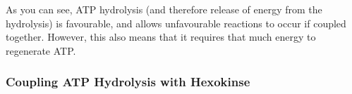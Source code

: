 As you can see, ATP hydrolysis (and therefore release of energy from the hydrolysis) is favourable, and allows unfavourable reactions to occur if coupled together.
However, this also means that it requires that much energy to regenerate ATP.

\subsubsection{Coupling ATP Hydrolysis with Hexokinse}

\begin{center}
\end{center}





























































